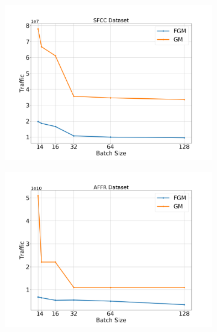 \begin{figure}[H]
\begin{subfigure}[b]{0.45\textwidth}
        \caption{}
    \end{subfigure}
    \begin{subfigure}[b]{0.45\textwidth}
        \centering
        \includegraphics[width=\textwidth]{./images/results/sfc-plots/exp_Fig_2_3.png}
        \caption{}
    \end{subfigure}
    \hfill
    \begin{subfigure}[b]{0.45\textwidth}
        \centering
        \includegraphics[width=\textwidth]{./images/results/amazon-plots/exp_Fig_2_3.png}
        \caption{}
    \end{subfigure}
    \caption{}
    \label{fig:sfcc-affr_2_2_2_3}
\end{figure}

